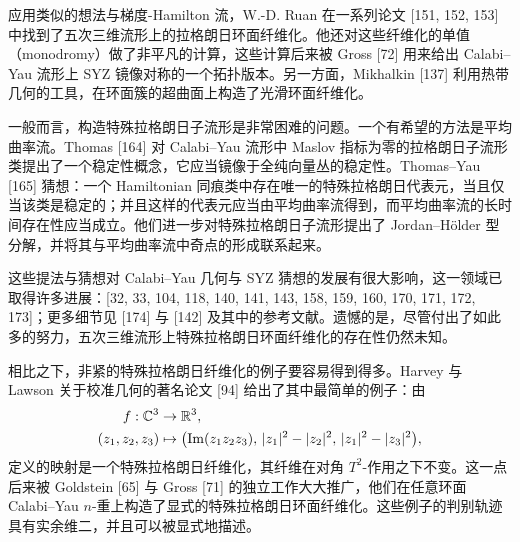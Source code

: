 应用类似的想法与梯度-Hamilton 流，W.-D. Ruan 在一系列论文 [151, 152, 153] 中找到了五次三维流形上的拉格朗日环面纤维化。他还对这些纤维化的单值（monodromy）做了非平凡的计算，这些计算后来被 Gross [72] 用来给出 Calabi--Yau 流形上 SYZ 镜像对称的一个拓扑版本。另一方面，Mikhalkin [137] 利用热带几何的工具，在环面簇的超曲面上构造了光滑环面纤维化。

一般而言，构造特殊拉格朗日子流形是非常困难的问题。一个有希望的方法是平均曲率流。Thomas [164] 对 Calabi--Yau 流形中 Maslov 指标为零的拉格朗日子流形类提出了一个稳定性概念，它应当镜像于全纯向量丛的稳定性。Thomas--Yau [165] 猜想：一个 Hamiltonian 同痕类中存在唯一的特殊拉格朗日代表元，当且仅当该类是稳定的；并且这样的代表元应当由平均曲率流得到，而平均曲率流的长时间存在性应当成立。他们进一步对特殊拉格朗日子流形提出了 Jordan--Hölder 型分解，并将其与平均曲率流中奇点的形成联系起来。

这些提法与猜想对 Calabi--Yau 几何与 SYZ 猜想的发展有很大影响，这一领域已取得许多进展：[32, 33, 104, 118, 140, 141, 143, 158, 159, 160, 170, 171, 172, 173]；更多细节见 [174] 与 [142] 及其中的参考文献。遗憾的是，尽管付出了如此多的努力，五次三维流形上特殊拉格朗日环面纤维化的存在性仍然未知。

相比之下，非紧的特殊拉格朗日纤维化的例子要容易得到得多。Harvey 与 Lawson 关于校准几何的著名论文 [94] 给出了其中最简单的例子：由
\[
\begin{aligned}
f:\mathbb{C}^3&\to\mathbb{R}^3,\\
(z_1,z_2,z_3)&\mapsto\bigl(\operatorname{Im}(z_1z_2z_3),\,|z_1|^2-|z_2|^2,\,|z_1|^2-|z_3|^2\bigr),
\end{aligned}
\]
定义的映射是一个特殊拉格朗日纤维化，其纤维在对角 $T^2$-作用之下不变。这一点后来被 Goldstein [65] 与 Gross [71] 的独立工作大大推广，他们在任意环面 Calabi--Yau $n$-重上构造了显式的特殊拉格朗日环面纤维化。这些例子的判别轨迹具有实余维二，并且可以被显式地描述。
